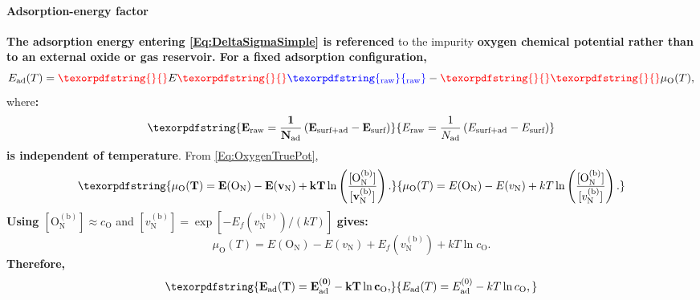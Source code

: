 \documentclass[preprint,12pt,sort&compress]{elsarticle}
\newcommand{\?}{\stackrel{?}{=}}
\providecommand{\DIFaddtex}[1]{{\bf #1}} %
\providecommand{\DIFdeltex}[1]{} %
\providecommand{\DIFaddbegin}{\protect\color{blue}} %
\providecommand{\DIFaddend}{\protect\color{black}} %
\providecommand{\DIFdelbegin}{\protect\color{red}} %
\providecommand{\DIFdelend}{\protect\color{black}} %
\providecommand{\DIFadd}[1]{\texorpdfstring{\DIFaddtex{#1}}{#1}} %
\providecommand{\DIFdel}[1]{\texorpdfstring{\DIFdeltex{#1}}{}} %
\begin{document}
\paragraph{Adsorption-energy factor} \DIFdelbegin \DIFdel{From the definition of the adsorption energy (\cref{Eq:Ead}), the adsorption energy referred }\DIFdelend \DIFaddbegin \DIFadd{The adsorption energy entering \cref{Eq:DeltaSigmaSimple} is referenced }\DIFaddend to the impurity \DIFdelbegin \DIFdel{chemical potential is:
}\DIFdelend \DIFaddbegin \DIFadd{oxygen chemical potential rather than to an external oxide or gas reservoir. For a fixed adsorption configuration,
}\DIFaddend \begin{equation}
E_\text{ad}(T) = \DIFdelbegin \DIFdel{\frac{1}{N_\text{ad}}}%
\DIFdelend E\DIFdelbegin \DIFdel{_\text{surf+ad} }\DIFdelend \DIFaddbegin \DIFadd{_\text{raw} }\DIFaddend - \DIFdelbegin \DIFdel{E_\text{surf}}%
\DIFdel{- }\DIFdelend \mu_\text{O}(T),
\end{equation}
where\DIFdelbegin \DIFdel{$\frac{1}{N_\text{ad}}(E_\text{surf+ad} - E_\text{surf})$ is the raw (reference-free) adsorption energy, a $T$-independent quantity obtained directly from DFT slab calculations}\DIFdelend \DIFaddbegin \DIFadd{:
}\begin{equation}
\DIFadd{E_\text{raw} = \frac{1}{N_\text{ad}} \left( E_\text{surf+ad} - E_\text{surf} \right)
}\end{equation}
\DIFadd{is independent of temperature}\DIFaddend . From \cref{Eq:OxygenTruePot},
\DIFdelbegin \DIFdel{using $[\text{O}_\text{N}^{(\text{b})}] \approx c_\text{O}$ }\DIFdelend \DIFaddbegin \begin{equation}
\DIFadd{\mu_\text{O}(T) = E(\text{O}_\text{N}) - E(v_\text{N}) + kT \ln\left( \frac{ [\text{O}_\text{N}^{(\text{b})}] }{ [v_\text{N}^{(\text{b})}] } \right).
}\end{equation}
\DIFadd{Using $[\text{O}_\text{N}^{(\text{b})}]\approx c_\text{O}$ }\DIFaddend and $[v_\text{N}^{(\text{b})}] = \exp[-E_f(v_\text{N}^{(\text{b})})/(kT)]$ \DIFdelbegin \DIFdel{:
}\DIFdelend \DIFaddbegin \DIFadd{gives:
}\DIFaddend \begin{equation}
\mu_\text{O}(T) = E(\text{O}_\text{N}) - E(v_\text{N}) + E_f(v_\text{N}^{(\text{b})}) + kT \ln c_\text{O}.
\label{Eq:App:muOimp}
\end{equation}
\DIFdelbegin \DIFdel{Substituting:
}\DIFdelend \DIFaddbegin \DIFadd{Therefore,
}\begin{equation}
\DIFadd{E_\text{ad}(T) = E_\text{ad}^{(0)} - kT \ln c_\text{O},
\label{Eq:App:EadImpExplicit}
}\end{equation}
\end{document}
